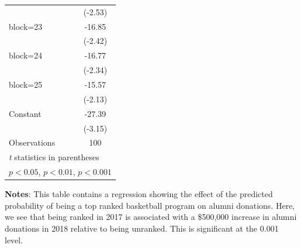 \documentclass{article}
\begin{document}
{\begin{longtable}{l*{1}{c}}
                    &     (-2.53)         \\
[1em]
block=23            &      -16.85\sym{*}  \\
                    &     (-2.42)         \\
[1em]
block=24            &      -16.77\sym{*}  \\
                    &     (-2.34)         \\
[1em]
block=25            &      -15.57\sym{*}  \\
                    &     (-2.13)         \\
[1em]
Constant            &      -27.39\sym{**} \\
                    &     (-3.15)         \\
\hline
Observations        &         100         \\
\hline\hline
\multicolumn{2}{l}{\footnotesize \textit{t} statistics in parentheses}\\
\multicolumn{2}{l}{\footnotesize \sym{*} \(p<0.05\), \sym{**} \(p<0.01\), \sym{***} \(p<0.001\)}\\
\end{longtable}
}


\textbf{Notes}: This table contains a regression showing the effect of the predicted probability of being a top ranked basketball program on alumni donations. Here, we see that being ranked in 2017 is associated with a \$500,000 increase in alumni donations in 2018 relative to being unranked. This is significant at the 0.001 level.
\end{document}
